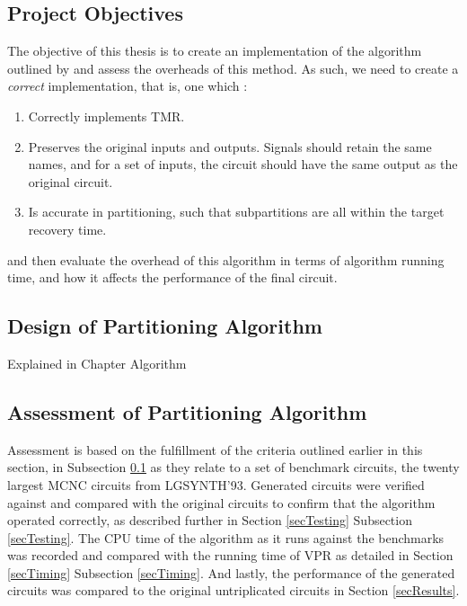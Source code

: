 \documentclass[12pt,final,oneside]{dwThesis} %
\begin{document}
   \subsection{Project Objectives}
   \label{secObjectives}
   The objective of this thesis is to create an implementation of the algorithm
   outlined by \cite{DiesselChange} and assess the overheads of this method.  As
   such, we need to create a \textit{correct} implementation, that is, one which
   :
   \begin{enumerate}

      \item Correctly implements TMR.
      \item Preserves the original inputs and outputs. Signals should retain
         the same names, and for a set of inputs, the circuit should have
         the same output as the original circuit.
      \item Is accurate in partitioning, such that subpartitions are all
         within the target recovery time.  
   \end{enumerate}
   and then
   evaluate the overhead of this algorithm in terms of algorithm running
   time, and how it affects the performance of the final circuit.

   \subsection{Design of Partitioning Algorithm}
   Explained in Chapter
   Algorithm \subsection{Assessment of
      Partitioning Algorithm} Assessment is based on the fulfillment of
   the criteria outlined earlier in this section, in Subsection
   \ref{secObjectives} as they relate to a set of benchmark circuits, the
   twenty largest MCNC circuits from LGSYNTH'93.  Generated circuits were
   verified against and compared with the original circuits to confirm
   that the algorithm operated correctly, as described further in Section
   \ref{secTesting} Subsection \ref{secTesting}.  The \gls{CPU} time of
   the algorithm as it runs against the benchmarks was recorded and
   compared with the running time of \gls{VPR} as detailed in Section
   \ref{secTiming} Subsection \ref{secTiming}.  And lastly, the
   performance of the generated circuits was compared to the original
   untriplicated circuits in Section \ref{secResults}.
\end{document}
